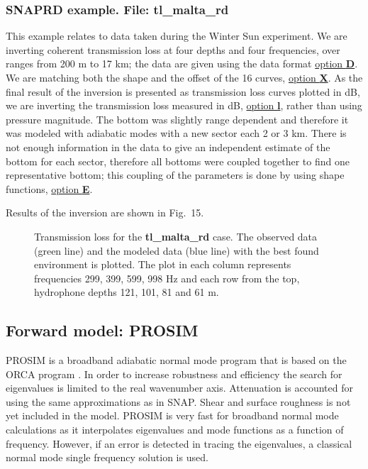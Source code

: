 \documentclass{saclantc}
\begin{document}
\subsubsection{SNAPRD example. File: {\bf tl\_malta\_rd}}
\label{se:malta}

This example relates to data taken during  
the Winter Sun experiment. We are inverting coherent transmission loss
at four depths and four frequencies, over ranges from 200 m to 17 km; the data
are given using the data format \underline{option {\bf D}}. We are
matching both the shape and the offset of the 16 curves,
\underline{option {\bf X}}. As the final result of the inversion is
presented as
transmission loss curves plotted in dB,
 we are inverting the transmission loss
measured in dB, \underline{option {\bf l}}, rather than using pressure
magnitude.
The bottom was slightly range dependent and therefore it was modeled
with adiabatic modes with a new sector each 2 or 3 km. There is not
enough information in the data to give an independent estimate of the
bottom for each sector, therefore all bottoms were coupled together to
find one representative bottom; this coupling of the parameters is
done by using shape functions, \underline{option {\bf E}}.

Results of the inversion are shown in Fig.~15.
\begin{figure}
\epsfxsize=13.5cm
\centerline{}
\caption{Transmission loss for the {\bf tl\_malta\_rd} case. The observed data
(green line) and the modeled data (blue line) with the best found 
environment is plotted.  The plot in each column represents frequencies  299, 399, 599,
998 Hz and 
each row from the top,  hydrophone depths 121, 101, 81 and  61  m.}
\label{fig:malta_fit}
\end{figure}

\subsection{Forward model: PROSIM }

{\sf PROSIM} \cite{prosim} is a broadband adiabatic normal mode program that is based on
the {\sf ORCA} program \cite{levinson:asa95,westwood:asa96}. 
In order to increase  robustness and efficiency
the search for eigenvalues is limited to the real wavenumber axis.
Attenuation is accounted for using the same approximations as in {\sf SNAP}.
Shear and surface roughness is not yet included in the model.
{\sf PROSIM} is very fast for broadband normal mode calculations as it
interpolates eigenvalues and mode functions as  a function of frequency.
However, if an error is detected in tracing  the eigenvalues, a
classical normal mode single frequency solution is used.
\end{document}

